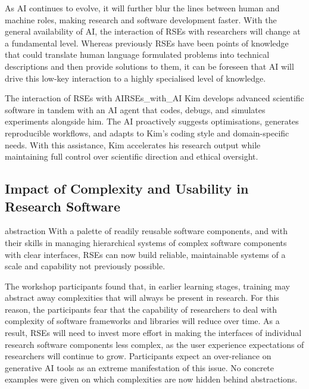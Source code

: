 \documentclass{eceasst}
\begin{document}
As AI continues to evolve, it will further blur the lines between human and machine roles, making research and software development faster.
With the general availability of AI, the interaction of RSEs with researchers will change at a fundamental level.
Whereas previously RSEs have been points of knowledge that could translate human language formulated problems into technical descriptions and then provide solutions to them,
it can be foreseen that AI will drive this low-key interaction to a highly specialised level of knowledge.

\begin{story}{The interaction of RSEs with AI}{RSEs_with_AI}
Kim develops advanced scientific software in tandem with an AI agent that codes,
debugs, and simulates experiments alongside him. The AI proactively suggests optimisations,
generates reproducible workflows, and adapts to Kim’s coding style and domain-specific needs.
With this assistance, Kim accelerates his research output while maintaining full control over scientific direction and ethical oversight.
\end{story}

\subsection{Impact of Complexity and Usability in Research Software}
\begin{whatis}{}{abstraction}
With a palette of readily reusable software components,
and with their skills in managing hierarchical systems of complex software components with clear interfaces,
RSEs can now build reliable, maintainable systems of a scale and capability not previously possible.
\end{whatis}

The workshop participants found that, in earlier learning stages,
training may abstract away complexities that will always be present in research.
For this reason, the participants fear that the capability of researchers to deal with complexity
of software frameworks and libraries will reduce over time.
As a result, RSEs will need to invest more effort in making the interfaces of individual research software components
less complex, as the user experience expectations of researchers will continue to grow.
Participants expect an over-reliance on generative AI tools as an extreme manifestation of this issue.
No concrete examples were given on which complexities are now hidden behind abstractions.
\end{document}
